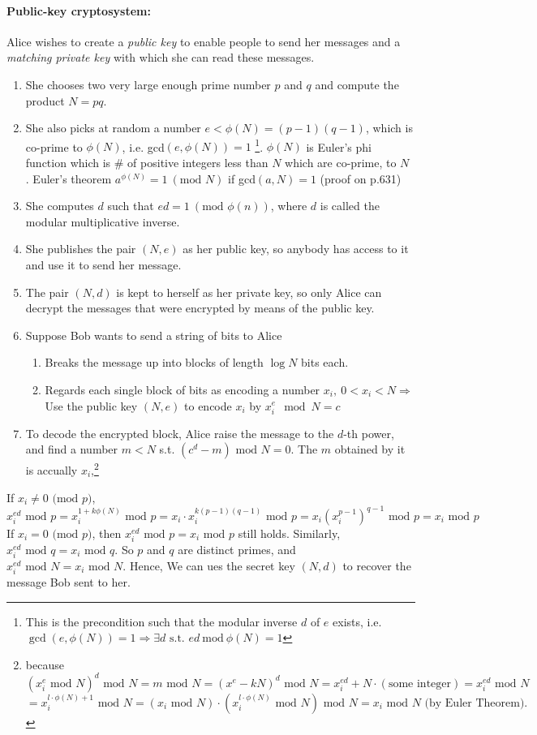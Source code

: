 \documentclass[]{book}
\theoremstyle{nonumberplain}
\begin{document}
\paragraph{Public-key cryptosystem:} Alice wishes to create a \emph{public key} to enable people to send her messages and a \emph{matching private key} with which she can read these messages. 
\begin{enumerate}
	\item She chooses two very large enough prime number $p$ and $q$ and compute the product $N = pq$.
	\item She also picks at random a number $e<\phi(N)=(p-1)(q-1)$, which is co-prime to  $\phi(N)$, i.e. gcd$(e,\phi(N))=1$ \footnote{This is the precondition such that the modular inverse $d$ of $e$ exists, i.e. $\gcd(e, \phi(N)) = 1 \Rightarrow \exists d \text{ s.t. } ed \ \text{mod} \ \phi(N) = 1$}. $\phi(N)$ is Euler's phi function which is \# of positive integers less than $N$ which are co-prime, to $N$ . Euler's theorem $a^{\phi(N)} = 1 \ (\text{mod }N)$ if gcd$(a,N)=1$ (proof on p.631)
	\item She computes $d$ such that $ed=1 \ (\text{mod } \phi(n))$, where $d$ is called the modular multiplicative inverse.
	\item She publishes the pair $(N,e)$ as her public key, so anybody has access to it and use it to send her message.
	\item The pair $(N,d)$ is kept to herself as her private key, so only Alice can decrypt the messages that were encrypted by means of the public key.
	\item Suppose Bob wants to send a string of bits to Alice
\begin{enumerate}
	\item Breaks the message up into blocks of length $\log{N}$ bits each.
	\item Regards each single block of bits as encoding a number $x_{i},\ 0<x_{i}<N\Rightarrow$ Use the public key $(N,e)$ to encode  $x_{i}$ by $x_{i}^{e}\mod{N} = c$
\end{enumerate}
	\item To decode the encrypted block, Alice raise the message to the $d$-th power, and find a number $m < N$ s.t. $(c^{d} - m) \text{ mod } N = 0$. The $m$ obtained by it is accually $x_{i}$,\footnote{because
\[
(x_{i}^{e} \text{ mod }N)^{d} \text{ mod }N = m \text{ mod }N = (x^{e} - kN)^{d}\text{ mod }N = x_{i}^{ed} + N \cdot (\text{some integer})= x_{i}^{ed} \text{ mod }N 
\]
\[
= x_{i}^{l\cdot\phi(N)+1} \text{ mod }N  = (x_{i} \text{ mod }N) \cdot (x_{i}^{l\cdot\phi(N)} \text{ mod }N) \text{ mod }N = x_{i} \text{ mod }N\text{ (by Euler Theorem}).
\]}
\end{enumerate}
If $x_{i} \neq 0 \text{ (mod } p)$,
$$x_{i}^{ed} \text{ mod } p = x_{i}^{1+k\phi(N)} \text{ mod } p = x_{i} \cdot x_{i}^{k(p-1)(q-1)} \text{ mod } p = x_{i}(x_{i}^{p-1})^{q-1}\text{ mod } p = x_{i} \text{ mod } p$$
If $x_{i} = 0 \text{ (mod } p)$, then $x_{i}^{ed} \text{ mod } p = x_{i} \text{ mod } p$ still holds.
Similarly, $x_{i}^{ed} \text{ mod } q = x_{i} \text{ mod } q$.
So $p$ and $q$ are distinct primes, and $x_{i}^{ed} \text{ mod } N = x_{i} \text{ mod } N$.
Hence, We can ues the secret key $(N, d)$ to recover the message Bob sent to her.
\end{document}
